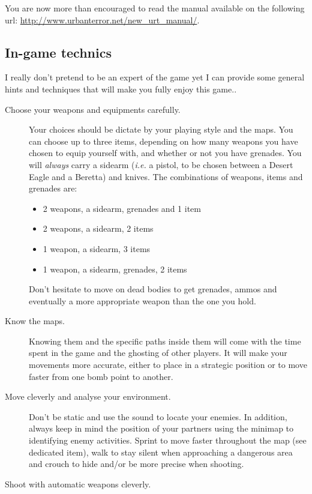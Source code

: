 You are now more than encouraged to read the manual available on the following url:
\url{http://www.urbanterror.net/new_urt_manual/}.

\subsection{In-game technics}
\label{sec:urt:game:technics}

I really don't pretend to be an expert of the game yet I can provide some
general hints and techniques that will make you fully enjoy this game..
\begin{description}
\item[Choose your weapons and equipments carefully.] 
  Your choices should be dictate by your playing style and the maps. 
  You can choose up to three items, depending on how many weapons you have
  chosen to equip yourself with, and whether or not you have grenades.
  You will \emph{always} carry a sidearm (\emph{i.e.} a pistol, to be chosen
  between a Desert Eagle and a Beretta) and knives.
  The combinations of weapons, items and grenades are:
  \begin{itemize}
  \item 2 weapons, a sidearm, grenades and 1 item
  \item 2 weapons, a sidearm, 2 items
  \item 1 weapon, a sidearm, 3 items
  \item 1 weapon, a sidearm, grenades, 2 items
  \end{itemize}
  Don't hesitate to move on dead bodies to get grenades, ammos and eventually a
  more appropriate weapon than the one you hold.
\item[Know the maps.] 
  Knowing them and the specific paths inside them will come with the time
  spent in the game and the ghosting of other players. It will make your
  movements more accurate, either to place in a strategic position or to move
  faster from one bomb point to another. 
\item[Move cleverly and analyse your environment.] 
  Don't be static and use the sound to locate your enemies. 
  In addition, always keep in mind the position of your partners using the
  minimap to identifying enemy activities. 
  Sprint to move faster throughout the map (see dedicated item), walk to stay silent when
  approaching a dangerous area and crouch to hide and/or be more precise when
  shooting.
\item[Shoot with automatic weapons cleverly.] 

\end{description}

